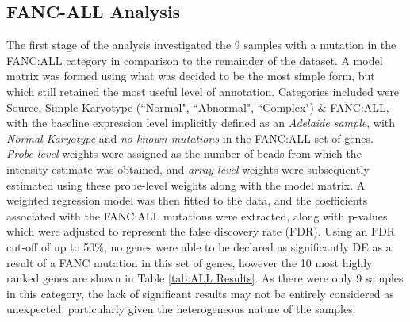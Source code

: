 \documentclass{article}\usepackage{knitr}
\begin{document}





\subsection{FANC-ALL Analysis}
The first stage of the analysis investigated the 9 samples with a mutation in the FANC:ALL category in comparison to the remainder of the dataset.
A model matrix was formed using what was decided to be the most simple form, but which still retained the most useful level of annotation.
Categories included were Source, Simple Karyotype (``Normal", ``Abnormal", ``Complex") \& FANC:ALL, with the baseline expression level implicitly defined as an \textit{Adelaide sample}, with \textit{Normal Karyotype} and \textit{no known mutations} in the FANC:ALL set of genes.
\textit{Probe-level} weights were assigned as the number of beads from which the intensity estimate was obtained, and \textit{array-level} weights were subsequently estimated using these probe-level weights along with the model matrix.
A weighted regression model was then fitted to the data, and the coefficients associated with the FANC:ALL mutations were extracted, along with p-values which were adjusted to represent the false discovery rate (FDR).
Using an FDR cut-off of up to 50\%, no genes were able to be declared as significantly DE as a result of a FANC mutation in this set of genes, however the 10 most highly ranked genes are shown in Table \ref{tab:ALL Results}.
As there were only 9 samples in this category, the lack of significant results may not be entirely considered as unexpected, particularly given the heterogeneous nature of the samples.
\end{document}
